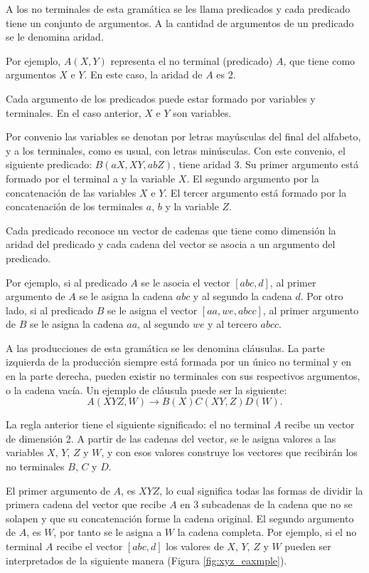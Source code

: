 \documentclass[12pt]{article}
\begin{document}
A los no terminales de esta gramática se les llama predicados y cada predicado tiene un conjunto de argumentos. 
A la cantidad de argumentos de un predicado se le denomina aridad.

Por ejemplo, $A(X,Y)$ representa el no terminal (predicado) $A$, que tiene como argumentos $X$ e $Y$. En este caso, la aridad de $A$ es 2.

Cada argumento de los predicados puede estar formado por variables y terminales. En el caso anterior, $X$ e $Y$ son variables.

Por convenio las variables se denotan por letras mayúsculas del final del alfabeto, y a los terminales, como es 
usual, con letras minúsculas. Con este convenio, el siguiente predicado: $B(aX, XY, abZ)$, tiene aridad 3. Su 
primer argumento está formado por el terminal a y la variable $X$. El segundo argumento por la concatenación 
de las variables $X$ e $Y$. El tercer argumento está formado por la concatenación de los terminales $a$, $b$ y 
la variable $Z$. 

Cada predicado reconoce un vector de cadenas que tiene como dimensión la aridad del predicado y cada cadena 
del vector se asocia a un argumento del predicado.

Por ejemplo, si al predicado $A$ se le asocia el vector $[abc,d]$, al primer argumento de $A$ se le asigna
la cadena $abc$ y al segundo la cadena $d$. Por otro lado, si al predicado $B$ se le asigna el vector $[aa,we,abcc]$,
al primer argumento de $B$ se le asigna la cadena $aa$, al segundo $we$ y al tercero $abcc$.

A las producciones de esta gramática se les denomina cláusulas. La parte izquierda de la producción 
siempre está formada por un único no terminal y en en la parte derecha, pueden existir no terminales 
con sus respectivos argumentos, o la cadena vacía. Un ejemplo de cláusula puede ser la siguiente:
$$A(XYZ,W)\to B(X)C(XY,Z)D(W).$$

La regla anterior tiene el siguiente significado: el no terminal $A$ recibe un vector de dimensión 2. A partir 
de las cadenas del vector, se le asigna valores a las variables $X$, $Y$, $Z$ y $W$, y con esos valores 
construye los vectores que recibirán los no terminales $B$, $C$ y $D$.


El primer argumento de $A$, es $XYZ$, lo cual significa todas las formas de dividir la primera cadena del vector que recibe $A$ en 3 subcadenas de la cadena que no se solapen
y que su concatenación forme la cadena original. El segundo argumento de $A$, es $W$, por tanto se le asigna a $W$ la cadena completa. 
Por ejemplo, si el no terminal $A$ recibe el vector $[abc,d]$ los valores de $X$, $Y$, $Z$ y $W$
pueden ser interpretados de la siguiente manera (Figura \ref{fig:xyz_eaxmple}).
\end{document}
